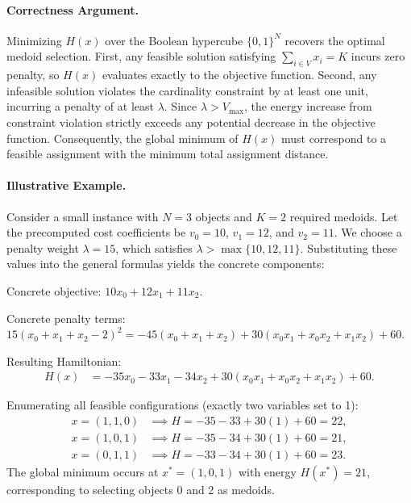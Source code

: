 \documentclass[12pt]{article}
\begin{document}
\paragraph{Correctness Argument.}
Minimizing $H(x)$ over the Boolean hypercube $\{0,1\}^N$ recovers the optimal medoid selection. First, any feasible solution satisfying $\sum_{i \in V} x_i = K$ incurs zero penalty, so $H(x)$ evaluates exactly to the objective function. Second, any infeasible solution violates the cardinality constraint by at least one unit, incurring a penalty of at least $\lambda$. Since $\lambda > V_{\max}$, the energy increase from constraint violation strictly exceeds any potential decrease in the objective function. Consequently, the global minimum of $H(x)$ must correspond to a feasible assignment with the minimum total assignment distance.

\paragraph{Illustrative Example.}
Consider a small instance with $N = 3$ objects and $K = 2$ required medoids. Let the precomputed cost coefficients be $v_0 = 10$, $v_1 = 12$, and $v_2 = 11$. We choose a penalty weight $\lambda = 15$, which satisfies $\lambda > \max\{10, 12, 11\}$. Substituting these values into the general formulas yields the concrete components:

Concrete objective: $10x_0 + 12x_1 + 11x_2$.

Concrete penalty terms: $15(x_0 + x_1 + x_2 - 2)^2 = -45(x_0 + x_1 + x_2) + 30(x_0 x_1 + x_0 x_2 + x_1 x_2) + 60$.

Resulting Hamiltonian:
\begin{align}
    H(x) &= -35x_0 - 33x_1 - 34x_2 + 30(x_0 x_1 + x_0 x_2 + x_1 x_2) + 60.
\end{align}

Enumerating all feasible configurations (exactly two variables set to 1):
\begin{align}
    x = (1, 1, 0) &\implies H = -35 - 33 + 30(1) + 60 = 22, \\
    x = (1, 0, 1) &\implies H = -35 - 34 + 30(1) + 60 = 21, \\
    x = (0, 1, 1) &\implies H = -33 - 34 + 30(1) + 60 = 23.
\end{align}
The global minimum occurs at $x^* = (1, 0, 1)$ with energy $H(x^*) = 21$, corresponding to selecting objects 0 and 2 as medoids.
\end{document}
